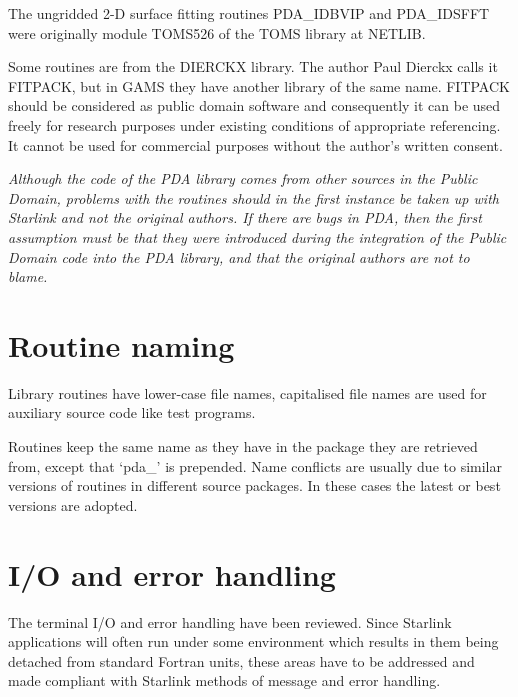 \documentclass[11pt,twoside,nolof]{starlink}
\begin{document}
The ungridded 2-D surface fitting routines
PDA\_IDBVIP and PDA\_IDSFFT were originally
module TOMS526 of the TOMS library at NETLIB.

   Some routines are from the DIERCKX library. The author Paul Dierckx
   calls it FITPACK, but in GAMS they have another library of the same
   name. FITPACK should be considered
   as public domain software and consequently it can be used freely for
   research purposes under existing conditions of appropriate referencing.
   It cannot be used for commercial purposes without the author's
   written consent.

   \emph{Although the code of the PDA library comes from other sources in
   the Public Domain, problems with the routines should in the first
   instance be taken up with Starlink and not the original authors. If
   there are bugs in PDA, then the first assumption must be that they
   were introduced during the integration of the Public Domain code into
   the PDA library, and that the original authors are not to blame.}


\section{Routine naming}

   Library routines have lower-case file names, capitalised file names
   are used for auxiliary source code like test programs.

   Routines keep the same name as they have in the package they are
   retrieved from, except that `pda\_' is prepended. Name conflicts are
   usually due to similar versions of routines in different source
   packages. In these cases the latest or best versions are adopted.


\section{I/O and error handling}

   The terminal I/O and error handling have been reviewed. Since
   Starlink applications will often run under some environment which
   results in them being
   detached from standard Fortran units, these areas have to be
   addressed and made compliant with Starlink methods of message and
   error handling.
\end{document}
